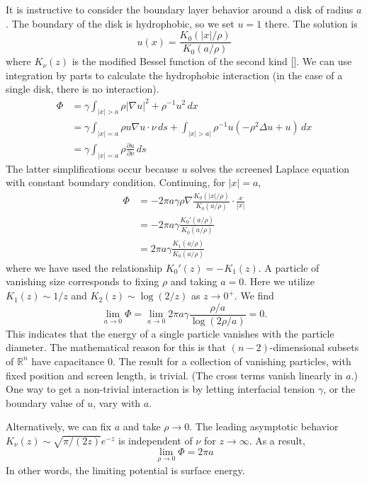 \documentclass[12pt]{article}
\begin{document}
It is instructive to consider the boundary layer behavior around a disk of radius $a$. The boundary of the 
disk is hydrophobic, so we set $u = 1$ there. The solution is 
\begin{equation}
    u(x) = \frac{K_0(|x|/\rho)}{K_0(a/\rho)}
\end{equation}
where $K_{\nu}(z)$ is the modified Bessel function of the second kind []. We can use integration by parts to calculate
the hydrophobic interaction (in the case of a single disk, there is no interaction).
\begin{align*}
\Phi
    &= \gamma \int_{|x| > a} \rho |\nabla u|^2 + \rho^{-1} u^2 \,dx \\
    &= \gamma \int_{|x| = a} \rho  u \nabla u \cdot \nu \, ds + \int_{|x| > a|} \rho^{-1} u (-\rho^2 \Delta u + u) \,dx \\
    &= \gamma \int_{|x| = a} \rho \frac{\partial u}{\partial \nu} \,ds
\end{align*}
The latter simplifications occur because $u$ solves the screened Laplace equation with constant boundary condition. Continuing, for $|x| = a$,
\begin{align*}
\Phi 
&= -2 \pi a \gamma \rho \nabla \frac{K_0(|x|/\rho)}{K_0(a/\rho)}\cdot \frac{x}{|x|}\\
&= -2 \pi a \gamma \frac{K_0'(a/\rho)}{K_0(a/\rho)}  \\
&=  2 \pi a \gamma \frac{K_1(a/\rho)}{K_0(a/\rho)}  
\end{align*}
where we have used the relationship $K_0'(z) = -K_1(z)$. 
A particle of vanishing size corresponds to fixing $\rho$ and taking $a = 0.$ Here we 
utilize $K_1(z) \sim 1/z$ and $K_2(z) \sim \log(2/z)$ as $z \to 0^+$. We find
\begin{equation}
    \lim_{a \to 0} \Phi = \lim_{a \to 0} 2\pi  a \gamma \frac{\rho/a}{\log(2\rho/a)} = 0.
\end{equation}
This indicates that the energy of a single particle vanishes with the particle diameter.
The mathematical reason for this is that $(n-2)$-dimensional subsets of $\mathbb{R}^n$ have capacitance $0$. The result for a collection of vanishing particles, with fixed position and screen length, is trivial. (The cross terms vanish linearly in $a$.) One way to get a non-trivial interaction is 
by letting interfacial tension $\gamma$, or the boundary value of $u$, vary with $a.$

Alternatively, we can fix $a$ and take $\rho \to 0$. The leading asymptotic behavior
$K_{\nu}(z) \sim \sqrt{\pi/(2z)}e^{-z}$ is independent of $\nu$ for $z \to \infty$. 
As a result, 
\begin{equation}
    \lim_{\rho \to 0} \Phi = 2 \pi a
\end{equation}
In other words, the limiting potential is surface energy. 
\end{document}

